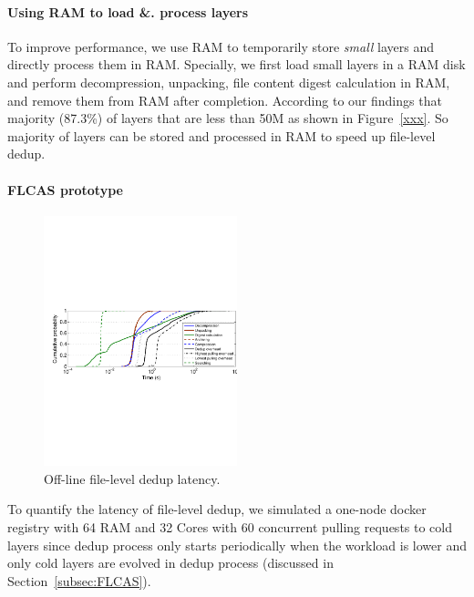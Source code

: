 \paragraph{Using RAM to load \&. process layers}

To improve performance, we use RAM to temporarily store \textit{small} layers and directly process them in RAM.
Specially, we first load small layers in a RAM disk and perform decompression, unpacking, file content digest calculation in RAM, and remove them from RAM after completion.   
According to our findings that majority (87.3\%) of layers that are less than 50M as shown in Figure~\ref{xxx}. So majority of layers can be stored and processed in RAM to speed up file-level dedup. 

\paragraph{FLCAS prototype}

\begin{figure}
	\centering
	\includegraphics[width=0.5\textwidth]{graphs/res-time.pdf}
	\caption{Off-line file-level dedup latency.
	}
	\label{fig:dedup-res}
\end{figure}

To quantify the latency of file-level dedup, we simulated a one-node docker registry with 64 RAM and 32 Cores with 60 concurrent pulling requests to cold layers since dedup process only starts periodically when the workload is lower and only cold layers are evolved in dedup process (discussed in Section~\ref{subsec:FLCAS}).

